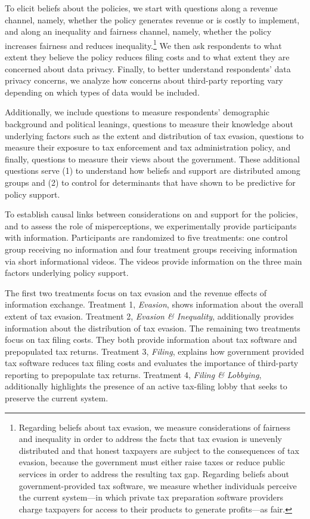 \documentclass[12pt]{article}
\begin{document}
To elicit beliefs about the policies, we start with questions along a revenue channel, namely, whether the policy generates revenue or is costly to implement, and along an inequality and fairness channel, namely, whether the policy increases fairness and reduces inequality.\footnote{Regarding beliefs about tax evasion, we measure considerations of fairness and inequality in order to address the facts that tax evasion is unevenly distributed \parencite{guyton2021tax,boas2024taxing} and that honest taxpayers are subject to the consequences of tax evasion, because the government must either raise taxes or reduce public services in order to address the resulting tax gap. Regarding beliefs about government-provided tax software, we measure whether individuals perceive the current system—in which private tax preparation software providers charge taxpayers for access to their products to generate profits—as fair.} We then ask respondents to what extent they believe the policy reduces filing costs and to what extent they are concerned about data privacy. Finally, to better understand respondents’ data privacy concerns, we analyze how concerns about third-party reporting vary depending on which types of data would be included.

Additionally, we include questions to measure respondents' demographic background and political leanings, questions to measure their knowledge about underlying factors such as the extent and distribution of tax evasion, questions to measure their exposure to tax enforcement and tax administration policy, and finally, questions to measure their views about the government. These additional questions serve (1) to understand how beliefs and support are distributed among groups and (2) to control for determinants that have shown to be predictive for policy support. 

To establish causal links between considerations on and support for the policies, and to assess the role of misperceptions, we experimentally provide participants with information. Participants are randomized to five treatments: one control group receiving no information and four treatment groups receiving information via short informational videos. The videos provide information on the three main factors underlying policy support.

The first two treatments focus on tax evasion and the revenue effects of information exchange. Treatment 1, \textit{Evasion}, shows information about the overall extent of tax evasion. Treatment 2, \textit{Evasion \& Inequality}, additionally provides information about the distribution of tax evasion. The remaining two treatments focus on tax filing costs. They both provide information about tax software and prepopulated tax returns. Treatment 3, \textit{Filing}, explains how government provided tax software reduces tax filing costs and evaluates the importance of third-party reporting to prepopulate tax returns. Treatment 4, \textit{Filing \& Lobbying}, additionally highlights the presence of an active tax-filing lobby that seeks to preserve the current system.
\end{document}
